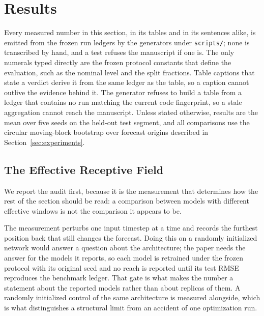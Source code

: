 \section{Results}
\label{sec:results}

Every measured number in this section, in its tables and in its sentences alike, is emitted from the frozen run ledgers by the generators under \texttt{scripts/}; none is transcribed by hand, and a test refuses the manuscript if one is. The only numerals typed directly are the frozen protocol constants that define the evaluation, such as the nominal level and the split fractions. Table captions that state a verdict derive it from the same ledger as the table, so a caption cannot outlive the evidence behind it. The generator refuses to build a table from a ledger that contains no run matching the current code fingerprint, so a stale aggregation cannot reach the manuscript. Unless stated otherwise, results are the mean over five seeds on the held-out test segment, and all comparisons use the circular moving-block bootstrap over forecast origins described in Section~\ref{sec:experiments}.

\subsection{The Effective Receptive Field}
\label{sec:results_receptive}

We report the audit first, because it is the measurement that determines how the rest of the section should be read: a comparison between models with different effective windows is not the comparison it appears to be.

The measurement perturbs one input timestep at a time and records the furthest position back that still changes the forecast. Doing this on a randomly initialized network would answer a question about the architecture; the paper needs the answer for the models it reports, so each model is retrained under the frozen protocol with its original seed and no reach is reported until its test RMSE reproduces the benchmark ledger. That gate is what makes the number a statement about the reported models rather than about replicas of them. A randomly initialized control of the same architecture is measured alongside, which is what distinguishes a structural limit from an accident of one optimization run.

